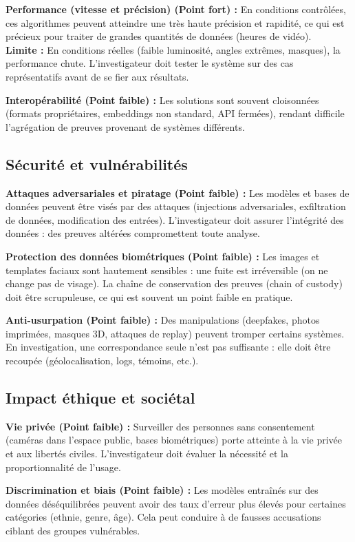 \documentclass[11pt,a4paper]{article}
\begin{document}
	\textbf{Performance (vitesse et précision) (Point fort) :} En conditions contrôlées, ces algorithmes peuvent atteindre une très haute précision et rapidité, ce qui est précieux pour traiter de grandes quantités de données (heures de vidéo). \\
	\textbf{Limite :} En conditions réelles (faible luminosité, angles extrêmes, masques), la performance chute. L’investigateur doit tester le système sur des cas représentatifs avant de se fier aux résultats.
	
	\textbf{Interopérabilité (Point faible) :} Les solutions sont souvent cloisonnées (formats propriétaires, embeddings non standard, API fermées), rendant difficile l’agrégation de preuves provenant de systèmes différents.
	\vspace{0.5cm}
	\subsection{Sécurité et vulnérabilités}
	\textbf{Attaques adversariales et piratage (Point faible) :} Les modèles et bases de données peuvent être visés par des attaques (injections adversariales, exfiltration de données, modification des entrées). L’investigateur doit assurer l’intégrité des données : des preuves altérées compromettent toute analyse.
	
	\textbf{Protection des données biométriques (Point faible) :} Les images et templates faciaux sont hautement sensibles : une fuite est irréversible (on ne change pas de visage). La chaîne de conservation des preuves (chain of custody) doit être scrupuleuse, ce qui est souvent un point faible en pratique.
	
	\textbf{Anti-usurpation (Point faible) :} Des manipulations (deepfakes, photos imprimées, masques 3D, attaques de replay) peuvent tromper certains systèmes. En investigation, une correspondance seule n’est pas suffisante : elle doit être recoupée (géolocalisation, logs, témoins, etc.).
	\vspace{0.5cm}
	\subsection{Impact éthique et sociétal}
	\textbf{Vie privée (Point faible) :} Surveiller des personnes sans consentement (caméras dans l’espace public, bases biométriques) porte atteinte à la vie privée et aux libertés civiles. L’investigateur doit évaluer la nécessité et la proportionnalité de l’usage.
	
	\textbf{Discrimination et biais (Point faible) :} Les modèles entraînés sur des données déséquilibrées peuvent avoir des taux d’erreur plus élevés pour certaines catégories (ethnie, genre, âge). Cela peut conduire à de fausses accusations ciblant des groupes vulnérables.
	
\end{document}
